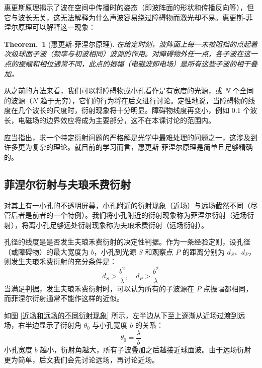 \documentclass[UTF8]{report}
\theoremstyle{MyLineTheoremStyle} %
\newtheorem{LineTheorem}{Theorem.\,}
\theoremstyle{MyBlockTheoremStyle} %
\theoremstyle{MySubsubsectionStyle} %
\begin{document}
惠更斯原理揭示了波在空间中传播时的姿态（即波阵面的形状和传播反向等），但它与波长无关，这无法解释为什么声波容易绕过障碍物而激光却不易。惠更斯-菲涅尔原理可以解释这一现象：

\begin{LineTheorem}[惠更斯-菲涅尔原理]\label{惠更斯-菲涅尔原理}
在给定时刻，波阵面上每一未被阻挡的点起着次级球面子波（频率与初波相同）波源的作用。对障碍物外任一点，各子波在这一点的振幅和相位通常不同，此点的振幅（电磁波即电场）是所有这些子波的相干叠加。
\end{LineTheorem}

从之前的方法来看，我们可以将障碍物或小孔看作是有宽度的光源，或 $N$ 个全同的波源（$N$ 趋于无穷），它们的行为将在后文进行讨论。定性地说，当障碍物的线度在几个波长的尺度时，衍射现象将十分明显。障碍物线度再变小，例如 0.1 个波长，电磁场的边界效应将成为主要部分，这不在本课讨论的范围内。

应当指出，求一个特定衍射问题的严格解是光学中最难处理的问题之一，这涉及到许多更为复杂的理论。就目前的学习而言，惠更斯-菲涅尔原理是简单且足够精确的。

\subsection{菲涅尔衍射与夫琅禾费衍射}

对其上有一小孔的不透明屏幕，小孔附近的衍射现象（近场）与远场截然不同（尽管后者是前者的一个特例）。我们将小孔附近的衍射现象称为菲涅尔衍射（近场衍射），将离小孔足够远处衍射现象称为夫琅禾费衍射（远场衍射）。

孔径的线度是是否发生夫琅禾费衍射的决定性判据。作为一条经验定则，设孔径（或障碍物）的最大宽度为 $b$，小孔到光源 $S$ 和观察点 $P$ 的距离分别为 $d_S$、$d_P$，则发生夫琅禾费衍射的充分条件是：
\begin{equation}
    d_S > \frac{b^2}{\lambda} ,\quad d_P > \frac{b^2}{\lambda}
\end{equation}
当满足判据，发生夫琅禾费衍射时，可以认为所有的子波源在 $P$ 点振幅都相同，而菲涅尔衍射通常不能作这样的近似。

如图 \ref{近场和远场的不同衍射现象} 所示，左半边从下至上逐渐从近场过渡到远场，右半边显示了衍射角 $\theta_0$ 与小孔宽度 $b$ 的关系：
\begin{equation}
\theta_0 = \frac{\lambda}{b}
\end{equation}
小孔宽度 $b$ 越小，衍射角越大，所有子波叠加之后越接近球面波。由于远场衍射更为简单，后文我们会先讨论远场，再讨论近场。
\end{document}
